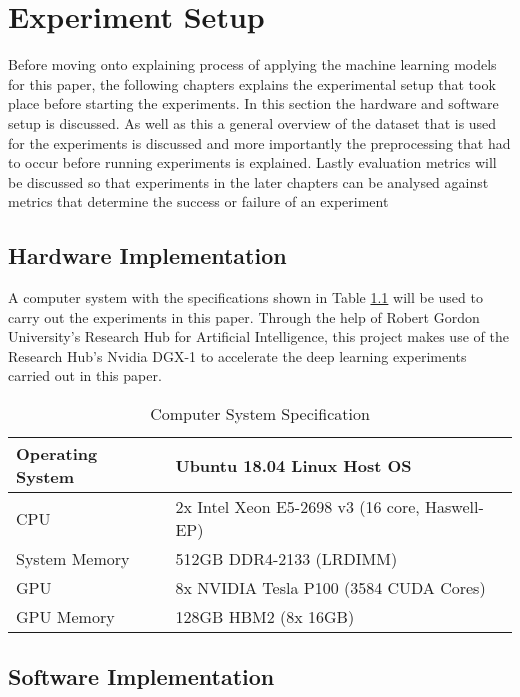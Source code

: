

\chapter{Experiment Setup}

Before moving onto explaining process of applying the machine learning models for this paper, the following chapters explains the experimental setup that took place before starting the experiments. In this section the hardware and software setup is discussed. As well as this a general overview of the dataset that is used for the experiments is discussed and more importantly the preprocessing that had to occur before running experiments is explained. Lastly evaluation metrics will be discussed so that experiments in the later chapters can be analysed against metrics that determine the success or failure of an experiment

\section{Hardware Implementation}

A computer system with the specifications shown in Table \ref{fig:DGX} will be used to carry out the experiments in this paper. Through the help of Robert Gordon University's Research Hub for Artificial Intelligence, this project makes use of the Research Hub's Nvidia DGX-1 to accelerate the deep learning experiments carried out in this paper. 

\begin{table}[H]
	\centering
	\small
	\caption{Computer System Specification}
	\label{fig:DGX}
	\begin{tabular}{ll}
		
		\hline
		Operating System & Ubuntu 18.04 Linux Host OS\\
		
		\hline
		CPU & 2x Intel Xeon E5-2698 v3 (16 core, Haswell-EP) \\
		\hline
		System Memory & 512GB DDR4-2133 (LRDIMM)\\
		\hline
		GPU & 8x NVIDIA Tesla P100 (3584 CUDA Cores)\\
		\hline
		GPU Memory & 128GB HBM2 (8x 16GB) \\
		\hline
	\end{tabular}
\end{table}


\section{Software Implementation}

